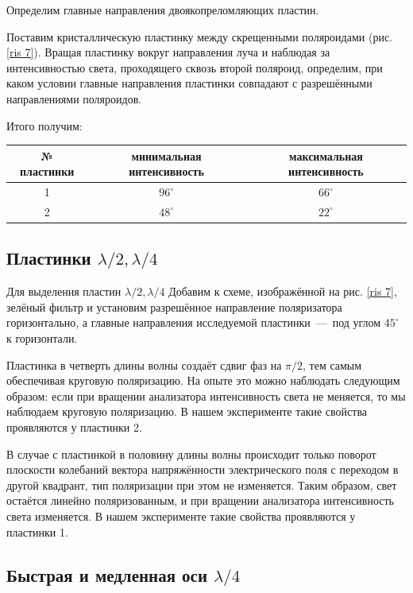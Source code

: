 \documentclass[a4paper,12pt]{article}
\begin{document}
Определим главные направления двоякопреломляющих пластин. 

Поставим кристаллическую пластинку между скрещенными поляроидами (рис. \ref{ris 7}). Вращая пластинку вокруг направления луча и наблюдая за интенсивностью света, проходящего сквозь второй поляроид, определим, при каком условии главные направления пластинки совпадают с разрешёнными направлениями поляроидов.

Итого получим:

\vspace{1mm}
\begin{center}
\begin{tabular}{|c|c|c|}
	\hline
	№ пластинки & минимальная интенсивность & максимальная интенсивность \\
	\hline
	1 & $96^\circ$ & $66^\circ$ \\
	\hline
	2 & $48^\circ$ & $22^\circ$ \\
	\hline
\end{tabular}
\end{center}


\subsection*{Пластинки $ \lambda/2, \lambda/4 $}

Для выделения пластин $ \lambda/2, \lambda/4 $ Добавим к схеме, изображённой на рис. \ref{ris 7}, зелёный фильтр и установим разрешённое направление поляризатора горизонтально, а главные направления исследуемой пластинки~---~под углом $ 45^\circ $ к горизонтали.

Пластинка в четверть длины волны создаёт сдвиг фаз на $\pi/2$, тем самым обеспечивая круговую поляризацию. На опыте это можно наблюдать следующим образом: если при вращении анализатора интенсивность света не меняется, то мы наблюдаем круговую поляризацию. В нашем эксперименте такие свойства проявляются у пластинки 2.

В случае с пластинкой в половину длины волны происходит только поворот плоскости колебаний вектора напряжённости электрического поля с переходом в другой квадрант, тип поляризации при этом не изменяется. Таким образом, свет остаётся линейно поляризованным, и при вращении анализатора интенсивность света изменяется. В нашем эксперименте такие свойства проявляются у пластинки 1.

\subsection*{Быстрая и медленная оси $ \lambda/4 $}
\end{document}
